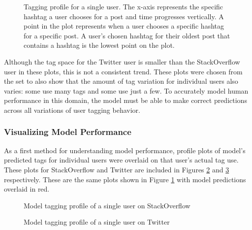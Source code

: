 \documentclass[man,floatsintext,donotrepeattitle]{apa6}
\begin{document}
\begin{figure}[!htbp]
  {%
    \setlength{\fboxsep}{0pt}%
    \setlength{\fboxrule}{1pt}%
    \hfill
    \hfill
    \caption{
      Tagging profile for a single user.
      The x-axis represents the specific hashtag a user chooses for a post and time progresses vertically.
      A point in the plot represents when a user chooses a specific hashtag for a specific post.
      A user's chosen hashtag for their oldest post that contains a hashtag is the lowest point on the plot.
    }
    \label{figPriorHTByTime}
  }%
\end{figure}

Although the tag space for the Twitter user is smaller than the StackOverflow user in these plots, this is not a consistent trend.
These plots were chosen from the set to also show that the amount of tag variation for individual users also varies: some use many tags and some use just a few.
To accurately model human performance in this domain, the model must be able to make correct predictions across all variations of user tagging behavior. 

\subsubsection{Visualizing Model Performance}

As a first method for understanding model performance, profile plots of model's predicted tags for individual users were overlaid on that user's actual tag use.
These plots for StackOverflow and Twitter are included in Figures \ref{figPriorHTMByTimeSO} and \ref{figPriorHTMByTimeT} respectively.
These are the same plots shown in Figure \ref{figPriorHTByTime} with model predictions overlaid in red. 

\begin{figure}[!htbp]
  \caption{Model tagging profile of a single user on StackOverflow}
  \label{figPriorHTMByTimeSO}
\end{figure}

\begin{figure}[!htbp]
  \caption{Model tagging profile of a single user on Twitter}
  \label{figPriorHTMByTimeT}
\end{figure}
\end{document}

